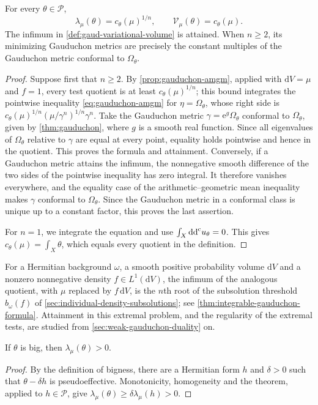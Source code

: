 \begin{theorem}\label{thm:gaud-volume-dual-formula}
For every $\theta\in\mathscr P$,
\[
 \lambda_\mu(\theta)=c_\theta(\mu)^{1/n},
 \qquad \mathcal V_\mu(\theta)=c_\theta(\mu).
\]
The infimum in \cref{def:gaud-variational-volume} is attained. When $n\geq2$, its minimizing Gauduchon metrics are precisely the constant multiples of the Gauduchon metric conformal to $\Omega_\theta$.
\end{theorem}
\begin{proof}
Suppose first that $n\geq2$. By \cref{prop:gauduchon-amgm}, applied with $\mathrm{d}V=\mu$ and $f=1$, every test quotient is at least $c_\theta(\mu)^{1/n}$; this bound integrates the pointwise inequality \eqref{eq:gauduchon-amgm} for $\eta=\Omega_\theta$, whose right side is $c_\theta(\mu)^{1/n}(\mu/\gamma^n)^{1/n}\gamma^n$. Take the Gauduchon metric $\gamma=\mathrm{e}^g\Omega_\theta$ conformal to $\Omega_\theta$, given by \cref{thm:gauduchon}, where $g$ is a smooth real function. Since all eigenvalues of $\Omega_\theta$ relative to $\gamma$ are equal at every point, equality holds pointwise and hence in the quotient. This proves the formula and attainment. Conversely, if a Gauduchon metric attains the infimum, the nonnegative smooth difference of the two sides of the pointwise inequality has zero integral. It therefore vanishes everywhere, and the equality case of the arithmetic--geometric mean inequality makes $\gamma$ conformal to $\Omega_\theta$. Since the Gauduchon metric in a conformal class is unique up to a constant factor, this proves the last assertion.

For $n=1$, we integrate the equation and use $\int_X\mathrm{dd}^{\mathrm{c}} u_\theta=0$. This gives $c_\theta(\mu)=\int_X\theta$, which equals every quotient in the definition.
\end{proof}

For a Hermitian background $\omega$, a smooth positive probability volume $\mathrm{d}V$ and a nonzero nonnegative density $f\in L^1(\mathrm{d}V)$, the infimum of the analogous quotient, with $\mu$ replaced by $f\,\mathrm{d}V$, is the $n$th root of the subsolution threshold $b_\omega(f)$ of \cref{sec:individual-density-subsolutions}; see \cref{thm:integrable-gauduchon-formula}. Attainment in this extremal problem, and the regularity of the extremal tests, are studied from \cref{sec:weak-gauduchon-duality} on.

\begin{corollary}\label{cor:gaud-volume-big-positive}
If $\theta$ is big, then $\lambda_\mu(\theta)>0$.
\end{corollary}
\begin{proof}
By the definition of bigness, there are a Hermitian form $h$ and $\delta>0$ such that $\theta-\delta h$ is pseudoeffective. Monotonicity, homogeneity and the theorem, applied to $h\in\mathscr P$, give
$\lambda_\mu(\theta)\geq\delta\lambda_\mu(h)>0$.
\end{proof}

